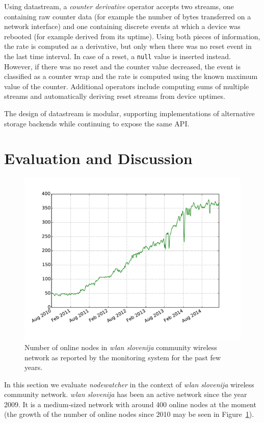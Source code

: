 \documentclass[5p,sort&compress]{elsarticle}
\newcommand{\nodewatcher}{\textit{nodewatcher}}
\newcommand{\wlanslovenija}{\textit{wlan slovenija}}
\begin{document}
Using datastream, a \textit{counter derivative} operator accepts two streams, one containing raw counter data (for example the number of bytes transferred on a network interface) and one containing discrete events at which a device was rebooted (for example derived from its uptime).
Using both pieces of information, the rate is computed as a derivative, but only when there was no reset event in the last time interval.
In case of a reset, a \texttt{null} value is inserted instead.
However, if there was no reset and the counter value decreased, the event is classified as a counter wrap and the rate is computed using the known maximum value of the counter.
Additional operators include computing sums of multiple streams and automatically deriving reset streams from device uptimes.

The design of datastream is modular, supporting implementations of alternative storage backends while continuing to expose the same API.

\section{Evaluation and Discussion}
\label{sec:evaluation}

\begin{figure}
  \centering
  \includegraphics[scale=0.45]{figures/wlansi-nodes-up.pdf}
  \caption{Number of online nodes in \wlanslovenija{} community wireless network as reported by the monitoring system for the past few years.}
  \label{fig:wlansi-nodes-up}
\end{figure}

In this section we evaluate \nodewatcher{} in the context of \wlanslovenija{} wireless community network.
\wlanslovenija{} has been an active network since the year 2009.
It is a medium-sized network with around $400$ online nodes at the moment (the growth of the number of online nodes since 2010 may be seen in Figure~\ref{fig:wlansi-nodes-up}).
\end{document}
